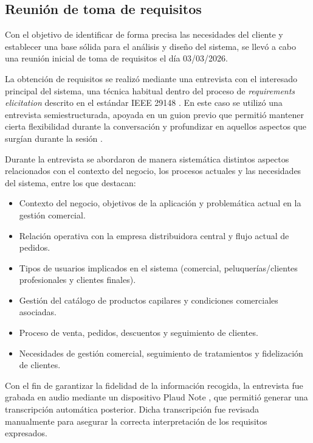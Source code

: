 \subsection{Reunión de toma de requisitos}

Con el objetivo de identificar de forma precisa las necesidades del cliente y establecer una base sólida para el análisis y diseño del sistema, se llevó a cabo una reunión inicial de toma de requisitos el día 03/03/2026.

La obtención de requisitos se realizó mediante una entrevista con el interesado principal del sistema, una técnica habitual dentro del proceso de \textit{requirements elicitation} descrito en el estándar IEEE 29148 \citep{ieee29148}. En este caso se utilizó una entrevista semiestructurada, apoyada en un guion previo que permitió mantener cierta flexibilidad durante la conversación y profundizar en aquellos aspectos que surgían durante la sesión \citep[pp.~104--106]{sommerville}.

Durante la entrevista se abordaron de manera sistemática distintos aspectos relacionados con el contexto del negocio, los procesos actuales y las necesidades del sistema, entre los que destacan:

\begin{itemize}
    \item Contexto del negocio, objetivos de la aplicación y problemática actual en la gestión comercial.
    \item Relación operativa con la empresa distribuidora central y flujo actual de pedidos.
    \item Tipos de usuarios implicados en el sistema (comercial, peluquerías/clientes profesionales y clientes finales).
    \item Gestión del catálogo de productos capilares y condiciones comerciales asociadas.
    \item Proceso de venta, pedidos, descuentos y seguimiento de clientes.
    \item Necesidades de gestión comercial, seguimiento de tratamientos y fidelización de clientes.
\end{itemize}

Con el fin de garantizar la fidelidad de la información recogida, la entrevista fue grabada en audio mediante un dispositivo Plaud Note \citep{plaudnote}, que permitió generar una transcripción automática posterior. Dicha transcripción fue revisada manualmente para asegurar la correcta interpretación de los requisitos expresados.

